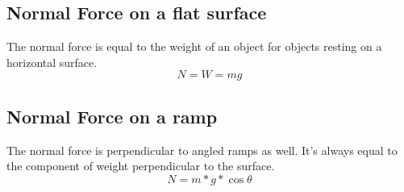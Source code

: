 \subsection{Normal Force on a flat surface}
The normal force is equal to the weight of an object for objects resting on a horizontal surface. \[N=W=mg\]
	
\subsection{Normal Force on a ramp}
The normal force is perpendicular to angled ramps as well. It's always equal to the component of weight perpendicular to the surface. \[N=m*g*\cos\theta\]